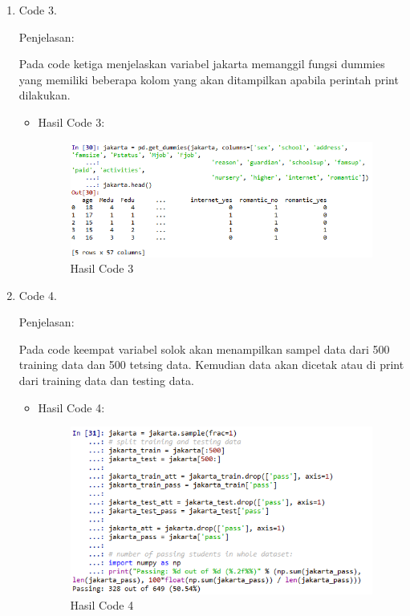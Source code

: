 \begin{itemize}
\begin{enumerate}
\begin{itemize}
\end{itemize}

\item Code 3.

Penjelasan:

Pada code ketiga menjelaskan variabel jakarta memanggil fungsi dummies yang memiliki beberapa kolom yang akan ditampilkan apabila perintah print dilakukan.
 
\begin{itemize}


\item Hasil Code 3:

\begin{figure}[ht]
\centering
\includegraphics[scale=0.4]{figures/AnnisaFathoroni-3.png}
\caption{Hasil Code 3}
\label{contoh}
\end{figure}

\end{itemize}


\item Code 4.
\par Penjelasan:
\par 
Pada code keempat variabel solok akan menampilkan sampel data dari 500 training data dan 500 tetsing data. Kemudian data akan dicetak atau di print dari training data dan testing data.
\begin{itemize}
\par
\item Hasil Code 4:

\begin{figure}[ht]
\centering
\includegraphics[scale=0.4]{figures/AnnisaFathoroni-4.png}
\caption{Hasil Code 4}
\label{contoh}
\end{figure}


\end{itemize}
\end{enumerate}
\end{itemize}
